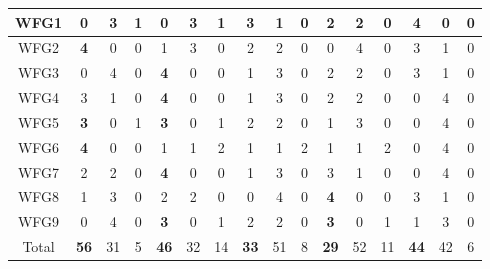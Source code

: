 \begin{table}[h]
{\begin{tabular}{|c|c|c|c|c|c|c|c|c|c|c|c|c|c|c|c|}
WFG1 & 0 & 3 & 1 & 0 & 3 & 1 & 3 & 1 & 0 & 2 & 2 & 0 & \textbf{4} & 0 & 0 \\ \hline
WFG2 & \textbf{4} & 0 & 0 & 1 & 3 & 0 & 2 & 2 & 0 & 0 & 4 & 0 & 3 & 1 & 0 \\ \hline
WFG3 & 0 & 4 & 0 & \textbf{4} & 0 & 0 & 1 & 3 & 0 & 2 & 2 & 0 & 3 & 1 & 0 \\ \hline
WFG4 & 3 & 1 & 0 & \textbf{4} & 0 & 0 & 1 & 3 & 0 & 2 & 2 & 0 & 0 & 4 & 0 \\ \hline
WFG5 & \textbf{3} & 0 & 1 & \textbf{3} & 0 & 1 & 2 & 2 & 0 & 1 & 3 & 0 & 0 & 4 & 0 \\ \hline
WFG6 & \textbf{4} & 0 & 0 & 1 & 1 & 2 & 1 & 1 & 2 & 1 & 1 & 2 & 0 & 4 & 0 \\ \hline
WFG7 & 2 & 2 & 0 & \textbf{4} & 0 & 0 & 1 & 3 & 0 & 3 & 1 & 0 & 0 & 4 & 0 \\ \hline
WFG8 & 1 & 3 & 0 & 2 & 2 & 0 & 0 & 4 & 0 & \textbf{4} & 0 & 0 & 3 & 1 & 0 \\ \hline
WFG9 & 0 & 4 & 0 & \textbf{3} & 0 & 1 & 2 & 2 & 0 & \textbf{3} & 0 & 1 & 1 & 3 & 0 \\ \hline
Total & \textbf{56} & 31 & 5 & \textbf{46} & 32 & 14 & \textbf{33} & 51 & 8 & \textbf{29} & 52 & 11 & \textbf{44} & 42 & 6 \\ \hline
\end{tabular}%
}
\end{table}


